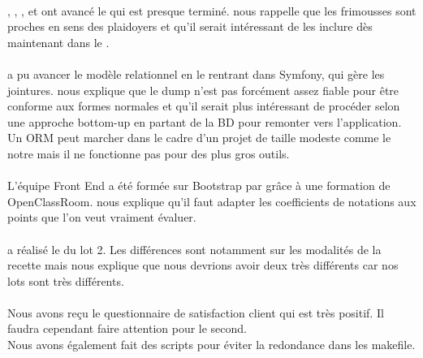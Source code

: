 \documentclass [a4paper] {article}
\begin{document}
\paragraph*{}
\Melissa, \Matthieu, \Michel, \Julie{} et \Florian{} ont avancé le \DCP{} qui est presque terminé. \nomTuteurPedago{} nous rappelle que les frimousses sont proches en sens des plaidoyers et qu'il serait intéressant de les inclure dès maintenant dans le \DCPCourt{}.

\paragraph*{}
\Kafui{} a pu avancer le modèle relationnel en le rentrant dans Symfony, qui gère les jointures. \nomTuteurPedago{} nous explique que le dump n'est pas forcément assez fiable pour être conforme aux formes normales et qu'il serait plus intéressant de procéder selon une approche bottom-up en partant de la BD pour remonter vers l'application. Un ORM peut marcher dans le cadre d'un projet de taille modeste comme le notre mais il ne fonctionne pas pour des plus gros outils.

\paragraph*{}
L'équipe Front End a été formée sur Bootstrap par \Matthieu{} grâce à une formation de OpenClassRoom. \nomTuteurPedago{} nous explique qu'il faut adapter les coefficients de notations aux points que l'on veut vraiment évaluer.

\paragraph*{}
\Michel{} a réalisé le \PTV{} du lot 2. Les différences sont notamment sur les modalités de la recette mais \nomTuteurPedago{} nous explique que nous devrions avoir deux \PTVCourt{} très différents car nos lots sont très différents.

\paragraph*{}
Nous avons reçu le questionnaire de satisfaction client qui est très positif. Il faudra cependant faire attention pour le second. \\
Nous avons également fait des scripts pour éviter la redondance dans les makefile.

\newpage
\end{document}
